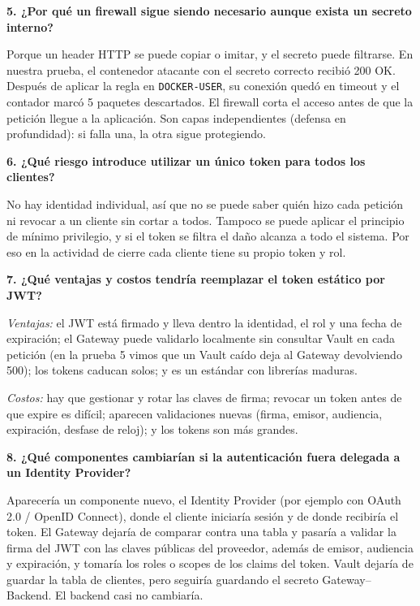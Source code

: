 \documentclass[11pt,a4paper]{article}
\begin{document}
\textbf{5. ¿Por qué un firewall sigue siendo necesario aunque exista un secreto interno?}

Porque un header HTTP se puede copiar o imitar, y el secreto puede filtrarse. En nuestra prueba, el contenedor atacante con el secreto correcto recibió 200 OK. Después de aplicar la regla en \texttt{DOCKER-USER}, su conexión quedó en timeout y el contador marcó 5 paquetes descartados. El firewall corta el acceso antes de que la petición llegue a la aplicación. Son capas independientes (defensa en profundidad): si falla una, la otra sigue protegiendo.

\textbf{6. ¿Qué riesgo introduce utilizar un único token para todos los clientes?}

No hay identidad individual, así que no se puede saber quién hizo cada petición ni revocar a un cliente sin cortar a todos. Tampoco se puede aplicar el principio de mínimo privilegio, y si el token se filtra el daño alcanza a todo el sistema. Por eso en la actividad de cierre cada cliente tiene su propio token y rol.

\textbf{7. ¿Qué ventajas y costos tendría reemplazar el token estático por JWT?}

\emph{Ventajas:} el JWT está firmado y lleva dentro la identidad, el rol y una fecha de expiración; el Gateway puede validarlo localmente sin consultar Vault en cada petición (en la prueba 5 vimos que un Vault caído deja al Gateway devolviendo 500); los tokens caducan solos; y es un estándar con librerías maduras.

\emph{Costos:} hay que gestionar y rotar las claves de firma; revocar un token antes de que expire es difícil; aparecen validaciones nuevas (firma, emisor, audiencia, expiración, desfase de reloj); y los tokens son más grandes.

\textbf{8. ¿Qué componentes cambiarían si la autenticación fuera delegada a un Identity Provider?}

Aparecería un componente nuevo, el Identity Provider (por ejemplo con OAuth 2.0 / OpenID Connect), donde el cliente iniciaría sesión y de donde recibiría el token. El Gateway dejaría de comparar contra una tabla y pasaría a validar la firma del JWT con las claves públicas del proveedor, además de emisor, audiencia y expiración, y tomaría los roles o scopes de los claims del token. Vault dejaría de guardar la tabla de clientes, pero seguiría guardando el secreto Gateway--Backend. El backend casi no cambiaría.

\end{document}
